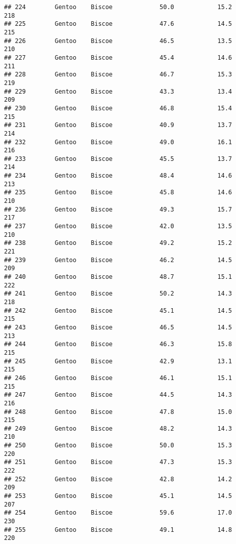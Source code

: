 \documentclass[
]{article}
\begin{document}
\begin{verbatim}
## 224        Gentoo    Biscoe             50.0            15.2               218
## 225        Gentoo    Biscoe             47.6            14.5               215
## 226        Gentoo    Biscoe             46.5            13.5               210
## 227        Gentoo    Biscoe             45.4            14.6               211
## 228        Gentoo    Biscoe             46.7            15.3               219
## 229        Gentoo    Biscoe             43.3            13.4               209
## 230        Gentoo    Biscoe             46.8            15.4               215
## 231        Gentoo    Biscoe             40.9            13.7               214
## 232        Gentoo    Biscoe             49.0            16.1               216
## 233        Gentoo    Biscoe             45.5            13.7               214
## 234        Gentoo    Biscoe             48.4            14.6               213
## 235        Gentoo    Biscoe             45.8            14.6               210
## 236        Gentoo    Biscoe             49.3            15.7               217
## 237        Gentoo    Biscoe             42.0            13.5               210
## 238        Gentoo    Biscoe             49.2            15.2               221
## 239        Gentoo    Biscoe             46.2            14.5               209
## 240        Gentoo    Biscoe             48.7            15.1               222
## 241        Gentoo    Biscoe             50.2            14.3               218
## 242        Gentoo    Biscoe             45.1            14.5               215
## 243        Gentoo    Biscoe             46.5            14.5               213
## 244        Gentoo    Biscoe             46.3            15.8               215
## 245        Gentoo    Biscoe             42.9            13.1               215
## 246        Gentoo    Biscoe             46.1            15.1               215
## 247        Gentoo    Biscoe             44.5            14.3               216
## 248        Gentoo    Biscoe             47.8            15.0               215
## 249        Gentoo    Biscoe             48.2            14.3               210
## 250        Gentoo    Biscoe             50.0            15.3               220
## 251        Gentoo    Biscoe             47.3            15.3               222
## 252        Gentoo    Biscoe             42.8            14.2               209
## 253        Gentoo    Biscoe             45.1            14.5               207
## 254        Gentoo    Biscoe             59.6            17.0               230
## 255        Gentoo    Biscoe             49.1            14.8               220

\end{verbatim}
\end{document}

